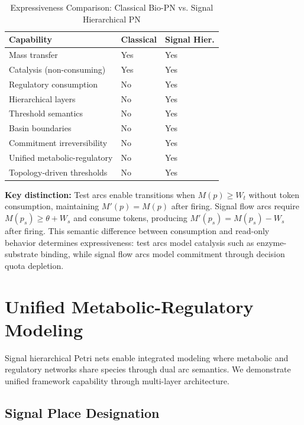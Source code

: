 \documentclass[10pt,letterpaper]{article}
\providecommand{\DIFaddtex}[1]{{\protect\color{blue}\uwave{#1}}} %
\providecommand{\DIFdeltex}[1]{{\protect\color{red}\sout{#1}}}                      %
\providecommand{\DIFaddbegin}{} %
\providecommand{\DIFaddend}{} %
\providecommand{\DIFdelbegin}{} %
\providecommand{\DIFdelend}{} %
\providecommand{\DIFadd}[1]{\texorpdfstring{\DIFaddtex{#1}}{#1}} %
\providecommand{\DIFdel}[1]{\texorpdfstring{\DIFdeltex{#1}}{}} %
\newcommand{\DIFscaledelfig}{0.5}
\newlength{\DIFdelgraphicswidth} %
\newlength{\DIFdelgraphicsheight} %
\newcommand{\DIFaddincludegraphics}[2][]{{\color{blue}\fbox{\DIFOincludegraphics[#1]{#2}}}} %
\newcommand{\DIFdelincludegraphics}[2][]{%
\sbox{\DIFdelgraphicsbox}{\DIFOincludegraphics[#1]{#2}}%
\settoboxwidth{\DIFdelgraphicswidth}{\DIFdelgraphicsbox} %
\settoboxtotalheight{\DIFdelgraphicsheight}{\DIFdelgraphicsbox} %
\scalebox{\DIFscaledelfig}{%
\parbox[b]{\DIFdelgraphicswidth}{\usebox{\DIFdelgraphicsbox}\\[-\baselineskip] \rule{\DIFdelgraphicswidth}{0em}}\llap{\resizebox{\DIFdelgraphicswidth}{\DIFdelgraphicsheight}{%
\setlength{\unitlength}{\DIFdelgraphicswidth}%
\begin{picture}(1,1)%
\thicklines\linethickness{2pt} %
{\color[rgb]{1,0,0}\put(0,0){\framebox(1,1){}}}%
{\color[rgb]{1,0,0}\put(0,0){\line( 1,1){1}}}%
{\color[rgb]{1,0,0}\put(0,1){\line(1,-1){1}}}%
\end{picture}%
}\hspace*{3pt}}} %
} %
\DeclareRobustCommand{\DIFaddbegin}{\DIFOaddbegin \let\includegraphics\DIFaddincludegraphics} %
\DeclareRobustCommand{\DIFaddend}{\DIFOaddend \let\includegraphics\DIFOincludegraphics} %
\DeclareRobustCommand{\DIFdelbegin}{\DIFOdelbegin \let\includegraphics\DIFdelincludegraphics} %
\DeclareRobustCommand{\DIFdelend}{\DIFOaddend \let\includegraphics\DIFOincludegraphics} %
\begin{document}
\begin{table}[h]
\centering
\small
\caption{Expressiveness Comparison: Classical Bio-PN vs. Signal Hierarchical PN}
\label{tab:comparison}
\begin{tabular}{p{5cm}p{2.5cm}p{2.5cm}}
\toprule
\textbf{Capability} & \textbf{Classical} & \textbf{Signal Hier.} \\
\midrule
Mass transfer & Yes & Yes \\
Catalysis (non-consuming) & Yes & Yes \\
Regulatory consumption & No & Yes \\
Hierarchical layers & No & Yes \\
Threshold semantics & No & Yes \\
Basin boundaries & No & Yes \\
Commitment irreversibility & No & Yes \\
Unified metabolic-regulatory & No & Yes \\
Topology-driven thresholds & No & Yes \\
\bottomrule
\end{tabular}
\end{table}

\textbf{Key distinction:} Test arcs enable transitions when \DIFdelbegin \DIFdel{$M(p) \geq W_t$ }\DIFdelend \DIFaddbegin \DIFadd{$M(p) > \tau_t((p,t))$ }\DIFaddend without token consumption, maintaining $M'(p) = M(p)$ after firing. Signal flow arcs require $M(p_s) \geq \theta + W_s$ and consume tokens, producing $M'(p_s) = M(p_s) - W_s$ after firing. This semantic difference between consumption and read-only behavior determines expressiveness: test arcs model catalysis such as enzyme-substrate binding, while signal flow arcs model commitment through decision quota depletion.

\section{Unified Metabolic-Regulatory Modeling}

Signal hierarchical Petri nets enable integrated modeling where metabolic and regulatory networks share species through dual arc semantics. We demonstrate unified framework capability through multi-layer architecture.

\subsection{Signal Place Designation}
\end{document}
